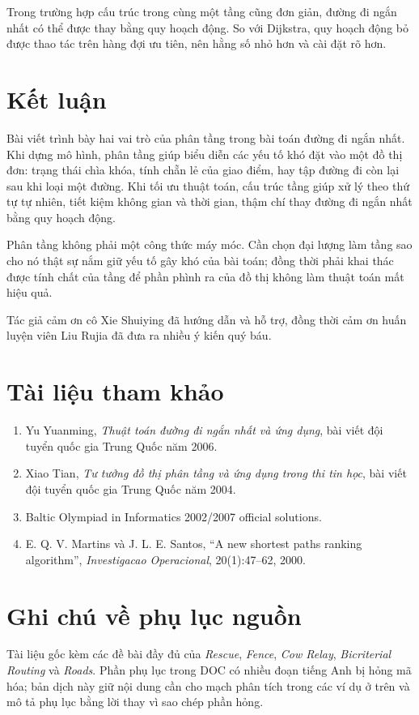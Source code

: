 \documentclass[11pt]{article}
\begin{document}
Trong trường hợp cấu trúc trong cùng một tầng cũng đơn giản, đường đi ngắn
nhất có thể được thay bằng quy hoạch động. So với Dijkstra, quy hoạch động bỏ
được thao tác trên hàng đợi ưu tiên, nên hằng số nhỏ hơn và cài đặt rõ hơn.

\section{Kết luận}

Bài viết trình bày hai vai trò của phân tầng trong bài toán đường đi ngắn
nhất. Khi dựng mô hình, phân tầng giúp biểu diễn các yếu tố khó đặt vào một
đồ thị đơn: trạng thái chìa khóa, tính chẵn lẻ của giao điểm, hay tập đường
đi còn lại sau khi loại một đường. Khi tối ưu thuật toán, cấu trúc tầng giúp
xử lý theo thứ tự tự nhiên, tiết kiệm không gian và thời gian, thậm chí thay
đường đi ngắn nhất bằng quy hoạch động.

Phân tầng không phải một công thức máy móc. Cần chọn đại lượng làm tầng sao
cho nó thật sự nắm giữ yếu tố gây khó của bài toán; đồng thời phải khai thác
được tính chất của tầng để phần phình ra của đồ thị không làm thuật toán mất
hiệu quả.

Tác giả cảm ơn cô Xie Shuiying đã hướng dẫn và hỗ trợ, đồng thời cảm ơn huấn
luyện viên Liu Rujia đã đưa ra nhiều ý kiến quý báu.

\section*{Tài liệu tham khảo}

\begin{enumerate}
  \item Yu Yuanming, \emph{Thuật toán đường đi ngắn nhất và ứng dụng}, bài
  viết đội tuyển quốc gia Trung Quốc năm 2006.
  \item Xiao Tian, \emph{Tư tưởng đồ thị phân tầng và ứng dụng trong thi tin
  học}, bài viết đội tuyển quốc gia Trung Quốc năm 2004.
  \item Baltic Olympiad in Informatics 2002/2007 official solutions.
  \item E. Q. V. Martins và J. L. E. Santos, ``A new shortest paths ranking
  algorithm'', \emph{Investigacao Operacional}, 20(1):47--62, 2000.
\end{enumerate}

\section*{Ghi chú về phụ lục nguồn}

Tài liệu gốc kèm các đề bài đầy đủ của \textit{Rescue}, \textit{Fence},
\textit{Cow Relay}, \textit{Bicriterial Routing} và \textit{Roads}. Phần phụ
lục trong DOC có nhiều đoạn tiếng Anh bị hỏng mã hóa; bản dịch này giữ nội
dung cần cho mạch phân tích trong các ví dụ ở trên và mô tả phụ lục bằng lời
thay vì sao chép phần hỏng.
\end{document}
